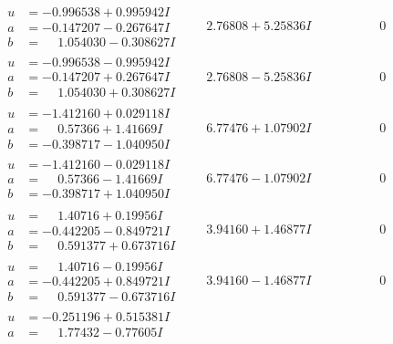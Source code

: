 \documentclass[1p]{elsarticle_modified}
\theoremstyle{definition}
\begin{document}
$$\begin{array}{c|c|c}
 \hline 
\begin{aligned}
u &= -0.996538 + 0.995942 I \\
a &= -0.147207 - 0.267647 I \\
b &= \phantom{-}1.054030 - 0.308627 I\end{aligned}
 & \phantom{-}2.76808 + 5.25836 I & \phantom{-0.000000 } 0 \\ \hline\begin{aligned}
u &= -0.996538 - 0.995942 I \\
a &= -0.147207 + 0.267647 I \\
b &= \phantom{-}1.054030 + 0.308627 I\end{aligned}
 & \phantom{-}2.76808 - 5.25836 I & \phantom{-0.000000 } 0 \\ \hline\begin{aligned}
u &= -1.412160 + 0.029118 I \\
a &= \phantom{-}0.57366 + 1.41669 I \\
b &= -0.398717 - 1.040950 I\end{aligned}
 & \phantom{-}6.77476 + 1.07902 I & \phantom{-0.000000 } 0 \\ \hline\begin{aligned}
u &= -1.412160 - 0.029118 I \\
a &= \phantom{-}0.57366 - 1.41669 I \\
b &= -0.398717 + 1.040950 I\end{aligned}
 & \phantom{-}6.77476 - 1.07902 I & \phantom{-0.000000 } 0 \\ \hline\begin{aligned}
u &= \phantom{-}1.40716 + 0.19956 I \\
a &= -0.442205 - 0.849721 I \\
b &= \phantom{-}0.591377 + 0.673716 I\end{aligned}
 & \phantom{-}3.94160 + 1.46877 I & \phantom{-0.000000 } 0 \\ \hline\begin{aligned}
u &= \phantom{-}1.40716 - 0.19956 I \\
a &= -0.442205 + 0.849721 I \\
b &= \phantom{-}0.591377 - 0.673716 I\end{aligned}
 & \phantom{-}3.94160 - 1.46877 I & \phantom{-0.000000 } 0 \\ \hline\begin{aligned}
u &= -0.251196 + 0.515381 I \\
a &= \phantom{-}1.77432 - 0.77605 I \\

\end{aligned}
\end{array}$$
\end{document}
